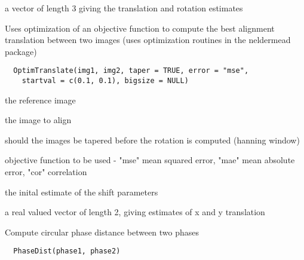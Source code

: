\documentclass[a4paper]{book}
\begin{document}
%
\begin{Value}
a vector of length 3 giving the translation and rotation
estimates
\end{Value}
%
\begin{Description}\relax
Uses optimization of an objective function to compute the
best alignment translation between two images (uses
optimization routines in the neldermead package)
\end{Description}
%
\begin{Usage}
\begin{verbatim}
  OptimTranslate(img1, img2, taper = TRUE, error = "mse",
    startval = c(0.1, 0.1), bigsize = NULL)
\end{verbatim}
\end{Usage}
%
\begin{Arguments}
\begin{ldescription}
\item[\code{img1}] the reference image

\item[\code{img2}] the image to align

\item[\code{taper}] should the images be tapered before the
rotation is computed (hanning window)

\item[\code{error}] objective function to be used - "mse" mean
squared error, "mae" mean absolute error, "cor"
correlation

\item[\code{startval}] the inital estimate of the shift
parameters
\end{ldescription}
\end{Arguments}
%
\begin{Value}
a real valued vector of length 2, giving estimates of x
and y translation
\end{Value}
%
\begin{Description}\relax
Compute circular phase distance between two phases
\end{Description}
%
\begin{Usage}
\begin{verbatim}
  PhaseDist(phase1, phase2)
\end{verbatim}
\end{Usage}
\end{document}
